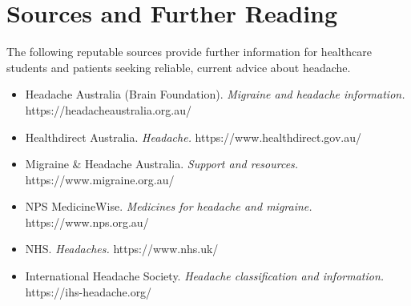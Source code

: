 \section*{Sources and Further Reading}
The following reputable sources provide further information for healthcare students and patients seeking reliable, current advice about headache.

\begin{itemize}
    \item Headache Australia (Brain Foundation). \textit{Migraine and headache information.} https://headacheaustralia.org.au/
    \item Healthdirect Australia. \textit{Headache.} https://www.healthdirect.gov.au/
    \item Migraine \& Headache Australia. \textit{Support and resources.} https://www.migraine.org.au/
    \item NPS MedicineWise. \textit{Medicines for headache and migraine.} https://www.nps.org.au/
    \item NHS. \textit{Headaches.} https://www.nhs.uk/
    \item International Headache Society. \textit{Headache classification and information.} https://ihs-headache.org/
\end{itemize}
